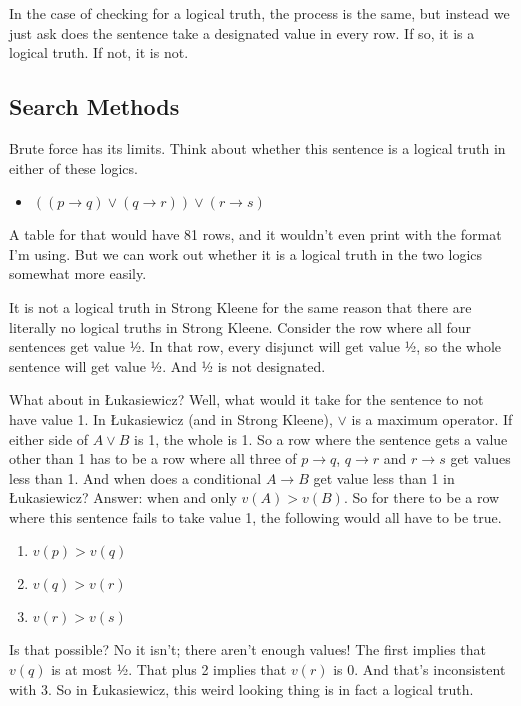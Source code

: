 \documentclass[
]{article}
\providecommand{\tightlist}{%
  \setlength{\itemsep}{0pt}\setlength{\parskip}{0pt}}\usepackage{longtable,booktabs,array}
\begin{document}
In the case of checking for a logical truth, the process is the same,
but instead we just ask does the sentence take a designated value in
every row. If so, it is a logical truth. If not, it is not.

\hypertarget{search-methods}{%
\subsection{Search Methods}\label{search-methods}}

Brute force has its limits. Think about whether this sentence is a
logical truth in either of these logics.

\begin{itemize}
\tightlist
\item
  \(((p \rightarrow q) \vee (q \rightarrow r)) \vee (r \rightarrow s)\)
\end{itemize}

A table for that would have 81 rows, and it wouldn't even print with the
format I'm using. But we can work out whether it is a logical truth in
the two logics somewhat more easily.

It is not a logical truth in Strong Kleene for the same reason that
there are literally no logical truths in Strong Kleene. Consider the row
where all four sentences get value ½. In that row, every disjunct will
get value ½, so the whole sentence will get value ½. And ½ is not
designated.

What about in Łukasiewicz? Well, what would it take for the sentence to
not have value 1. In Łukasiewicz (and in Strong Kleene), \(\vee\) is a
maximum operator. If either side of \(A \vee B\) is 1, the whole is 1.
So a row where the sentence gets a value other than 1 has to be a row
where all three of \(p \rightarrow q\), \(q \rightarrow r\) and
\(r \rightarrow s\) get values less than 1. And when does a conditional
\(A \rightarrow B\) get value less than 1 in Łukasiewicz? Answer: when
and only \(v(A) > v(B)\). So for there to be a row where this sentence
fails to take value 1, the following would all have to be true.

\begin{enumerate}
\def\labelenumi{\arabic{enumi}.}
\tightlist
\item
  \(v(p) > v(q)\)
\item
  \(v(q) > v(r)\)
\item
  \(v(r) > v(s)\)
\end{enumerate}

Is that possible? No it isn't; there aren't enough values! The first
implies that \(v(q)\) is at most ½. That plus 2 implies that \(v(r)\) is
0. And that's inconsistent with 3. So in Łukasiewicz, this weird looking
thing is in fact a logical truth.
\end{document}
